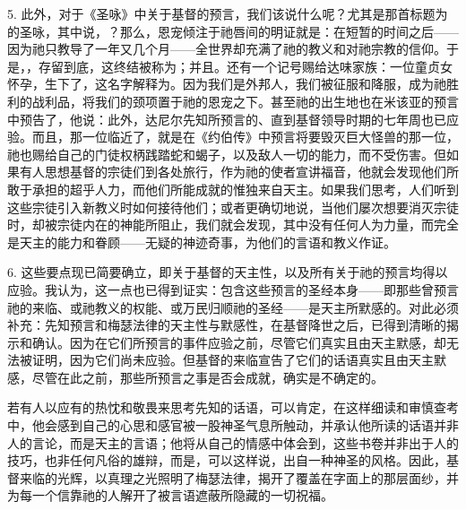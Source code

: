 5. 此外，对于《圣咏》中关于基督的预言，我们该说什么呢？尤其是那首标题为的圣咏，其中说，？那么，恩宠倾注于祂唇间的明证就是：在短暂的时间之后——因为祂只教导了一年又几个月——全世界却充满了祂的教义和对祂宗教的信仰。于是，，存留到底，这终结被称为；并且。还有一个记号赐给达味家族：一位童贞女怀孕，生下了，这名字解释为。因为我们是外邦人，我们被征服和降服，成为祂胜利的战利品，将我们的颈项置于祂的恩宠之下。甚至祂的出生地也在米该亚的预言中预告了，他说：此外，达尼尔先知所预言的、直到基督领导时期的七年周也已应验。而且，那一位临近了，就是在《约伯传》中预言将要毁灭巨大怪兽的那一位，祂也赐给自己的门徒权柄践踏蛇和蝎子，以及敌人一切的能力，而不受伤害。但如果有人思想基督的宗徒们到各处旅行，作为祂的使者宣讲福音，他就会发现他们所敢于承担的超乎人力，而他们所能成就的惟独来自天主。如果我们思考，人们听到这些宗徒引入新教义时如何接待他们；或者更确切地说，当他们屡次想要消灭宗徒时，却被宗徒内在的神能所阻止，我们就会发现，其中没有任何人为力量，而完全是天主的能力和眷顾——无疑的神迹奇事，为他们的言语和教义作证。\par

6. 这些要点现已简要确立，即关于基督的天主性，以及所有关于祂的预言均得以应验。我认为，这一点也已得到证实：包含这些预言的圣经本身——即那些曾预言祂的来临、或祂教义的权能、或万民归顺祂的圣经——是天主所默感的。对此必须补充：先知预言和梅瑟法律的天主性与默感性，在基督降世之后，已得到清晰的揭示和确认。因为在它们所预言的事件应验之前，尽管它们真实且由天主默感，却无法被证明，因为它们尚未应验。但基督的来临宣告了它们的话语真实且由天主默感，尽管在此之前，那些所预言之事是否会成就，确实是不确定的。\par

若有人以应有的热忱和敬畏来思考先知的话语，可以肯定，在这样细读和审慎查考中，他会感到自己的心思和感官被一股神圣气息所触动，并承认他所读的话语并非人的言论，而是天主的言语；他将从自己的情感中体会到，这些书卷并非出于人的技巧，也非任何凡俗的雄辩，而是，可以这样说，出自一种神圣的风格。因此，基督来临的光辉，以真理之光照明了梅瑟法律，揭开了覆盖在字面上的那层面纱，并为每一个信靠祂的人解开了被言语遮蔽所隐藏的一切祝福。\par

